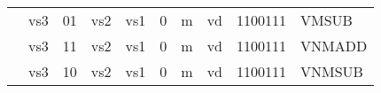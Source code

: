 \begin{table}[p]
\begin{small}
\begin{center}
\begin{tabular}{p{0in}p{0.4in}p{0.1in}p{0.3in}p{0.5in}p{0.5in}p{0.1in}p{0.3in}p{0.5in}p{0.7in}l}
&
\multicolumn{2}{|c|}{vs3} &
\multicolumn{1}{c|}{01} &
\multicolumn{1}{c|}{vs2} &
\multicolumn{1}{c|}{vs1} &
\multicolumn{1}{c|}{0} &
\multicolumn{1}{c|}{m} &
\multicolumn{1}{c|}{vd} &
\multicolumn{1}{c|}{1100111} & VMSUB \\
\cline{2-10}
  

&
\multicolumn{2}{|c|}{vs3} &
\multicolumn{1}{c|}{11} &
\multicolumn{1}{c|}{vs2} &
\multicolumn{1}{c|}{vs1} &
\multicolumn{1}{c|}{0} &
\multicolumn{1}{c|}{m} &
\multicolumn{1}{c|}{vd} &
\multicolumn{1}{c|}{1100111} & VNMADD \\
\cline{2-10}
  

&
\multicolumn{2}{|c|}{vs3} &
\multicolumn{1}{c|}{10} &
\multicolumn{1}{c|}{vs2} &
\multicolumn{1}{c|}{vs1} &
\multicolumn{1}{c|}{0} &
\multicolumn{1}{c|}{m} &
\multicolumn{1}{c|}{vd} &
\multicolumn{1}{c|}{1100111} & VNMSUB \\
\cline{2-10}
  

\end{tabular}
\end{center}
\end{small}

\label{instr-table}
\end{table}
  

\newpage

